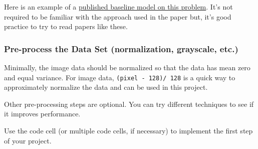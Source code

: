 \documentclass[11pt]{article}
\begin{document}
Here is an example of a
\href{http://yann.lecun.com/exdb/publis/pdf/sermanet-ijcnn-11.pdf}{published
baseline model on this problem}. It's not required to be familiar with
the approach used in the paper but, it's good practice to try to read
papers like these.

    \hypertarget{pre-process-the-data-set-normalization-grayscale-etc.}{%
\subsubsection{Pre-process the Data Set (normalization, grayscale,
etc.)}\label{pre-process-the-data-set-normalization-grayscale-etc.}}

    Minimally, the image data should be normalized so that the data has mean
zero and equal variance. For image data, \texttt{(pixel\ -\ 128)/\ 128}
is a quick way to approximately normalize the data and can be used in
this project.

Other pre-processing steps are optional. You can try different
techniques to see if it improves performance.

Use the code cell (or multiple code cells, if necessary) to implement
the first step of your project.
\end{document}
